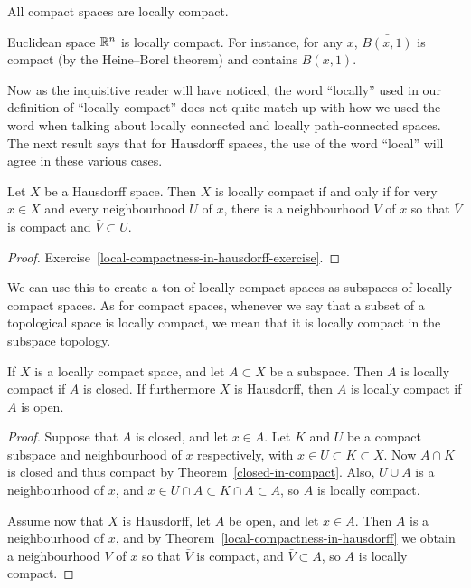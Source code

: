 \begin{example}
  All compact spaces are locally compact.
\end{example}
\begin{example}
  Euclidean space $\mathbb{R}^n$ is locally compact. For instance, for any $x$, $\bar{B(x,1)}$ is compact (by the Heine--Borel theorem) and contains $B(x,1)$.
\end{example}
Now as the inquisitive reader will have noticed, the word ``locally'' used in our definition of ``locally compact'' does not quite match up with how we used the word when talking about locally connected and locally path-connected spaces. The next result says that for Hausdorff spaces, the use of the word ``local'' will agree in these various cases.
\begin{thm}
  \label{local-compactness-in-hausdorff}
  Let $X$ be a Hausdorff space. Then $X$ is locally compact if and only if for very $x \in X$ and every neighbourhood $U$ of $x$, there is a neighbourhood $V$ of $x$ so that $\bar{V}$ is compact and $\bar V \subset U$.
\end{thm}
\begin{proof}
  Exercise~\ref{local-compactness-in-hausdorff-exercise}.
\end{proof}
We can use this to create a ton of locally compact spaces as subspaces of locally compact spaces. As for compact spaces, whenever we say that a subset of a topological space is locally compact, we mean that it is locally compact in the subspace topology.
\begin{prop}
  If $X$ is a locally compact space, and let $A \subset X$ be a subspace. Then $A$ is locally compact if $A$ is closed. If furthermore $X$ is Hausdorff, then $A$ is locally compact if $A$ is open.
\end{prop}
\begin{proof}
  Suppose that $A$ is closed, and let $x \in A$. Let $K$ and $U$ be a compact subspace and neighbourhood of $x$ respectively, with $x \in U \subset K \subset X$. Now $A \cap K$ is closed and thus compact by Theorem~\ref{closed-in-compact}. Also, $U \cup A$ is a neighbourhood of $x$, and $x \in U \cap A \subset K \cap A \subset A$, so $A$ is locally compact.
  
  Assume now that $X$ is Hausdorff, let $A$ be open, and let $x \in A$. Then $A$ is a neighbourhood of $x$, and by Theorem~\ref{local-compactness-in-hausdorff} we obtain a neighbourhood $V$ of $x$ so that $\bar{V}$ is compact, and $\bar{V} \subset A$, so $A$ is locally compact.
\end{proof}
